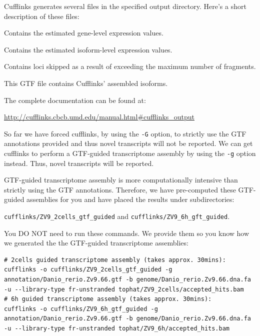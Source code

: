 \begin{information}
Cufflinks generates several files in the specified output directory. Here's a short description of these files:

\begin{description}[style=multiline,labelindent=0cm,align=right,leftmargin=\descriptionlabelspace,rightmargin=1.5cm,font=\ttfamily]
\item[genes.fpkm\_tracking] Contains the estimated gene-level expression values.
\item[isoforms.fpkm\_tracking] Contains the estimated isoform-level expression values.
\item[skipped.gtf] Contains loci skipped as a result of exceeding the maximum number of fragments.
\item[transcripts.gtf] This GTF file contains Cufflinks' assembled isoforms.
\end{description}

The complete documentation can be found at:

\url{http://cufflinks.cbcb.umd.edu/manual.html#cufflinks_output}
\end{information}

\begin{information}
So far we have forced cufflinks, by using the \texttt{-G} option, to strictly
use the GTF annotations provided and thus novel transcripts will not be reported. We
can get cufflinks to perform a GTF-guided transcriptome assembly by using the
\texttt{-g} option instead. Thus, novel transcripts will be reported.

\end{information}

\begin{warning}
GTF-guided transcriptome assembly is more computationally intensive than
strictly using the GTF annotations. Therefore, we have pre-computed these
GTF-guided assemblies for you and have placed the results under subdirectories:

\texttt{cufflinks/ZV9\_2cells\_gtf\_guided} and
\texttt{cufflinks/ZV9\_6h\_gft\_guided}.

You DO NOT need to run these commands. We provide them so you know how we
generated the the GTF-guided transcriptome assemblies:
\begin{lstlisting}
# 2cells guided transcriptome assembly (takes approx. 30mins):
cufflinks -o cufflinks/ZV9_2cells_gtf_guided -g annotation/Danio_rerio.Zv9.66.gtf -b genome/Danio_rerio.Zv9.66.dna.fa -u --library-type fr-unstranded tophat/ZV9_2cells/accepted_hits.bam
# 6h guided transcriptome assembly (takes approx. 30mins):
cufflinks -o cufflinks/ZV9_6h_gtf_guided -g annotation/Danio_rerio.Zv9.66.gtf -b genome/Danio_rerio.Zv9.66.dna.fa -u --library-type fr-unstranded tophat/ZV9_6h/accepted_hits.bam
\end{lstlisting}

\end{warning}

